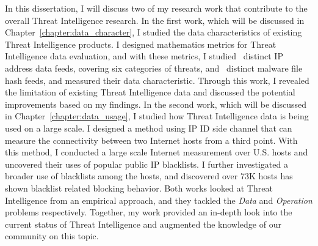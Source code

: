 \begin{dissertationintroduction}
In this dissertation, I will discuss two of my research work 
that contribute to the overall Threat Intelligence research. In the first
work, which will be discussed in Chapter~\ref{chapter:data_character}, 
I studied the data characteristics of existing Threat Intelligence products.
I designed mathematics metrics for Threat Intelligence data evaluation,
and with these metrics, I studied \numipfeeds\ distinct IP address 
data feeds, covering six categories of threats, and \numhashfeeds\ distinct
malware file hash feeds, and measured their data characteristic. Through this
work, I revealed the limitation of existing Threat Intelligence data and 
discussed the potential improvements based on my findings. In the second
work, which will be discussed in Chapter~\ref{chapter:data_usage}, I 
studied how Threat Intelligence data is being used on a large scale. 
I designed a method using IP ID side channel that can measure the 
connectivity between two Internet hosts from a third point. With this 
method, I conducted a large scale Internet measurement over {} 
U.S. hosts and uncovered their uses of {\blacklistnum} popular public IP
blacklists. I further investigated a broader use of blacklists among the 
hosts, and discovered over 73K hosts has shown blacklist related blocking 
behavior. Both works looked at Threat Intelligence from an empirical
approach, and they tackled the \textit{Data} and \textit{Operation} problems
respectively. Together, my work provided an in-depth look into the current
status of Threat Intelligence and augmented the knowledge of our community
on this topic.

\end{dissertationintroduction}
